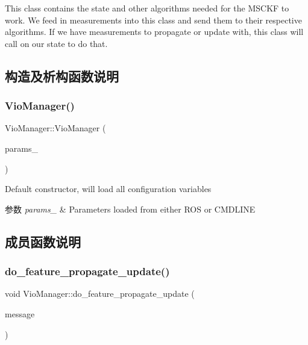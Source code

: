 This class contains the state and other algorithms needed for the M\+S\+C\+KF to work. We feed in measurements into this class and send them to their respective algorithms. If we have measurements to propagate or update with, this class will call on our state to do that. 

\subsection{构造及析构函数说明}
\mbox{\label{classov__msckf_1_1VioManager_aa2376a11794739f8d7811d6e7c0dd447}} 
\subsubsection{\texorpdfstring{Vio\+Manager()}{VioManager()}}
{\footnotesize\ttfamily Vio\+Manager\+::\+Vio\+Manager (\begin{DoxyParamCaption}\item[{\hyperlink{structov__msckf_1_1VioManagerOptions}{Vio\+Manager\+Options} \&}]{params\+\_\+ }\end{DoxyParamCaption})}



Default constructor, will load all configuration variables 


\begin{DoxyParams}{参数}
{\em params\+\_\+} & Parameters loaded from either R\+OS or C\+M\+D\+L\+I\+NE \\
\hline
\end{DoxyParams}


\subsection{成员函数说明}
\mbox{\label{classov__msckf_1_1VioManager_a31d3fade828a229a1b5a99abd9aaa243}} 
\subsubsection{\texorpdfstring{do\+\_\+feature\+\_\+propagate\+\_\+update()}{do\_feature\_propagate\_update()}}
{\footnotesize\ttfamily void Vio\+Manager\+::do\+\_\+feature\+\_\+propagate\+\_\+update (\begin{DoxyParamCaption}\item[{const \hyperlink{structov__core_1_1CameraData}{ov\+\_\+core\+::\+Camera\+Data} \&}]{message }\end{DoxyParamCaption})\hspace{0.3cm}{\ttfamily [protected]}}



